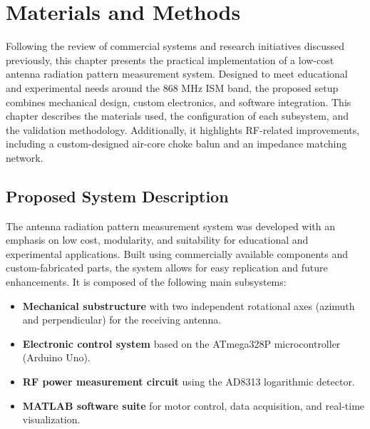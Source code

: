 \chapter{Materials and Methods}
\label{chap:materials_methods}


Following the review of commercial systems and research initiatives discussed previously, this chapter presents the practical implementation of a low-cost antenna radiation pattern measurement system. Designed to meet educational and experimental needs around the 868 MHz ISM band, the proposed setup combines mechanical design, custom electronics, and software integration. This chapter describes the materials used, the configuration of each subsystem, and the validation methodology. Additionally, it highlights RF-related improvements, including a custom-designed air-core choke balun and an impedance matching network.
\vspace{0.1em}

\section{Proposed System Description}
\label{sec:system_description}

The antenna radiation pattern measurement system was developed with an emphasis on low cost, modularity, and suitability for educational and experimental applications. Built using commercially available components and custom-fabricated parts, the system allows for easy replication and future enhancements. It is composed of the following main subsystems:

\begin{itemize}
    \item \textbf{Mechanical substructure} with two independent rotational axes (azimuth and perpendicular) for the receiving antenna.
    \item \textbf{Electronic control system} based on the ATmega328P microcontroller (Arduino Uno).
    \item \textbf{RF power measurement circuit} using the AD8313 logarithmic detector.
    \item \textbf{MATLAB software suite} for motor control, data acquisition, and real-time visualization.
\end{itemize}

